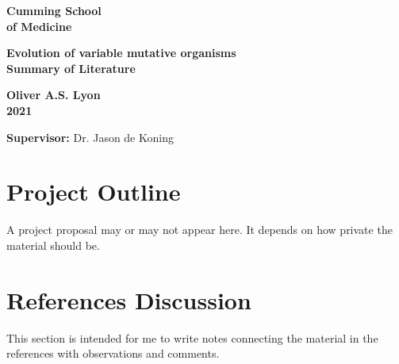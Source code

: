 \documentclass[a4paper,12pt]{article}
\begin{document}
\begin{minipage}[b]{110mm}
        {\Huge\bf Cumming School \\ of Medicine 
        \vspace*{17mm}}
\end{minipage}
\hfill
\begin{minipage}[t]{40mm}               
\end{minipage}
\par\noindent                                      %
\vspace*{5mm}
\begin{center}
        \Large\bf Evolution of variable mutative organisms\\
        \Large\bf Summary of Literature
\end{center}
\vspace*{3mm}
\begin{center}
        \bf Oliver A.S. Lyon\\                 %
        2021                         %
\end{center}
\vspace*{5mm}
{\bf Supervisor:} Dr. Jason de Koning                %

\section{Project Outline}

A project proposal may or may not appear here. 
It depends on how private the material should be.

\section{References Discussion}

This section is intended for me to write notes connecting the material in the 
references with observations and comments.

\nocite{*}


 
\end{document}

